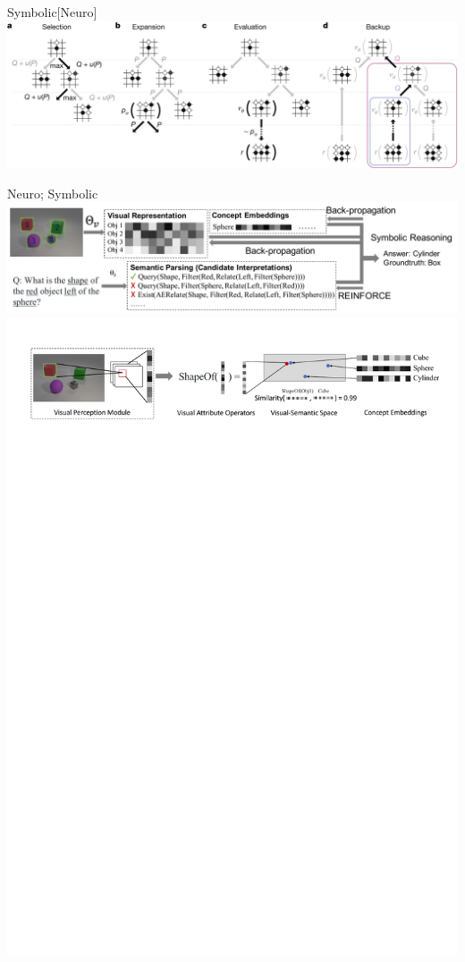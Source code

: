 \documentclass{lecture}
\begin{document}
\begin{frame}{Symbolic[Neuro]}
    \includegraphics[width=\textwidth]{41586_2016_BFnature16961_Fig3_HTML.png}
\end{frame}

\begin{frame}{Neuro; Symbolic}
    \includegraphics[width=\textwidth]{arXiv-1904.12584v1/raw/Framework.pdf}\\
    \vfill
    \includegraphics[width=\textwidth]{arXiv-1904.12584v1/raw/VSE.pdf}

\end{frame}
\end{document}
